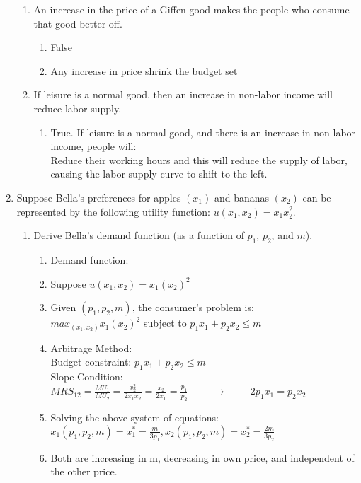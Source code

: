 \documentclass[11pt]{article}
\begin{document}
\begin{enumerate}
\begin{enumerate}
    \item An increase in the price of a Giffen good makes the people who consume that good better off.
    \begin{enumerate}
        \item False
        \item Any increase in price shrink the budget set
    \end{enumerate}

    \item If leisure is a normal good, then an increase in non-labor income will reduce labor supply.
    \begin{enumerate}
        \item True. If leisure is a normal good, and there is an increase in non-labor income, people will:\\ Reduce their working hours and this will reduce the supply of labor, causing the labor supply curve to shift to the left.
    \end{enumerate}

\end{enumerate}

\item Suppose Bella's preferences for apples $(x_{1})$ and bananas $(x_{2})$ can be represented by the following utility function: $u(x_{1},x_{2})=x_{1}x_{2}^{2}$.
    \begin{enumerate}
        \item Derive Bella's demand function (as a function of $p_{1}$, $p_{2}$, and $m$).
        \begin{enumerate}
            \item Demand function:
            \item Suppose $u(x_1, x_2) = x_1(x_2)^2$
            \item Given $(p_1, p_2, m)$, the consumer's problem is:\\
            $max_{(x_1, x_2)} x_1(x_2)^2$ subject to $p_1x_1 + p_2x_2 \leq m$
            \item Arbitrage Method:\\
            Budget constraint: $p_1x_1 + p_2x_2 \leq m$\\
            Slope Condition: $MRS_{12} = \frac{MU_1}{MU_2} = \frac{x^2_2}{2x_1x_2} = \frac{x_2}{2x_1} = \frac{p_1}{p_2} \hspace{1cm} \rightarrow \hspace{1cm} 2p_1x_1 = p_2x_2$
            \item Solving the above system of equations:\\
            $x_1(p_1, p_2, m)=x_1^* = \frac{m}{3p_1}, x_2(p_1, p_2, m) = x_2^* = \frac{2m}{3p_2}$
            \item Both are increasing in m, decreasing in own price, and independent of the other price.
        \end{enumerate}


\end{enumerate}
\end{enumerate}
\end{document}
